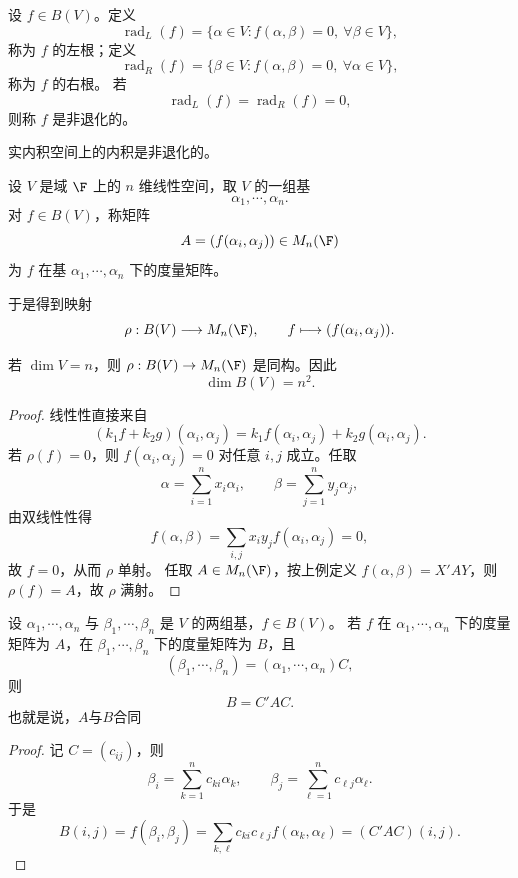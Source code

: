 \begin{definition}[根与非退化]\label{p1:concept:c7-l392}
	设 $f\in B(V)$。定义
	\[
	\operatorname{rad}_L(f)=\{\alpha\in V:f(\alpha,\beta)=0,\ \forall \beta\in V\},
	\]
	称为 $f$ 的左根；定义
	\[
	\operatorname{rad}_R(f)=\{\beta\in V:f(\alpha,\beta)=0,\ \forall \alpha\in V\},
	\]
	称为 $f$ 的右根。
	若
	\[
	\operatorname{rad}_L(f)=\operatorname{rad}_R(f)=0,
	\]
	则称 $f$ 是非退化的。
\end{definition}

实内积空间上的内积是非退化的。

\begin{definition}[度量矩阵]\label{p1:concept:c7-l411}
	设 $V$ 是域 $\F$ 上的 $n$ 维线性空间，取 $V$ 的一组基
	\[
	\alpha_1,\cdots,\alpha_n.
	\]
	对 $f\in B(V)$，称矩阵
	\[
	A=(f(\alpha_i,\alpha_j))\in M_n(\F)
	\]
	为 $f$ 在基 $\alpha_1,\cdots,\alpha_n$ 下的度量矩阵。
\end{definition}

于是得到映射
\[
\rho:B(V)\longrightarrow M_n(\F),
\qquad
f\longmapsto (f(\alpha_i,\alpha_j)).
\]

\begin{lemma}
	若 $\dim V=n$，则 $\rho:B(V)\to M_n(\F)$ 是同构。因此
	\[
	\dim B(V)=n^2.
	\]
\end{lemma}

\begin{proof}
	线性性直接来自
	\[
	(k_1f+k_2g)(\alpha_i,\alpha_j)
	=k_1f(\alpha_i,\alpha_j)+k_2g(\alpha_i,\alpha_j).
	\]
	若 $\rho(f)=0$，则 $f(\alpha_i,\alpha_j)=0$ 对任意 $i,j$ 成立。任取
	\[
	\alpha=\sum_{i=1}^n x_i\alpha_i,
	\qquad
	\beta=\sum_{j=1}^n y_j\alpha_j,
	\]
	由双线性性得
	\[
	f(\alpha,\beta)=\sum_{i,j}x_iy_jf(\alpha_i,\alpha_j)=0,
	\]
	故 $f=0$，从而 $\rho$ 单射。
	任取 $A\in M_n(\F)$，按上例定义 $f(\alpha,\beta)=X'AY$，则 $\rho(f)=A$，故 $\rho$ 满射。
\end{proof}

\begin{lemma}[度量矩阵的基变换]
	设 $\alpha_1,\cdots,\alpha_n$ 与 $\beta_1,\cdots,\beta_n$ 是 $V$ 的两组基，$f\in B(V)$。
	若 $f$ 在 $\alpha_1,\cdots,\alpha_n$ 下的度量矩阵为 $A$，在 $\beta_1,\cdots,\beta_n$ 下的度量矩阵为 $B$，且
	\[
	(\beta_1,\cdots,\beta_n)=(\alpha_1,\cdots,\alpha_n)C,
	\]
	则
	\[
	B=C'AC.
	\]
	也就是说，$A$与$B$合同
\end{lemma}

\begin{proof}
	记 $C=(c_{ij})$，则
	\[
	\beta_i=\sum_{k=1}^n c_{ki}\alpha_k,
	\qquad
	\beta_j=\sum_{\ell=1}^n c_{\ell j}\alpha_\ell.
	\]
	于是
	\[
	B(i,j)=f(\beta_i,\beta_j)
	=\sum_{k,\ell}c_{ki}c_{\ell j}f(\alpha_k,\alpha_\ell)
	=(C'AC)(i,j).
	\]
\end{proof}

